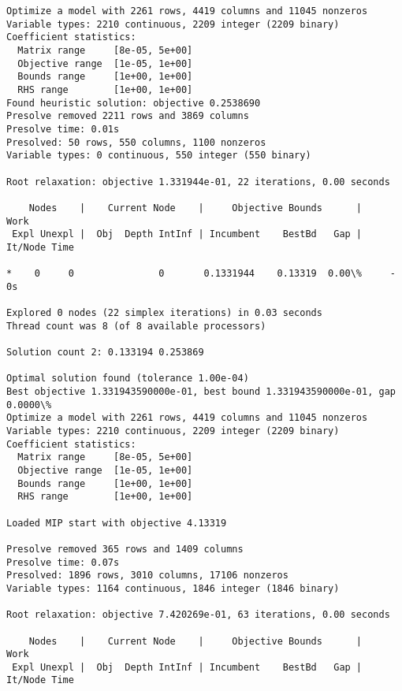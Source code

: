 \documentclass[11pt]{article}
\begin{document}
    \begin{Verbatim}[commandchars=\\\{\}]
Optimize a model with 2261 rows, 4419 columns and 11045 nonzeros
Variable types: 2210 continuous, 2209 integer (2209 binary)
Coefficient statistics:
  Matrix range     [8e-05, 5e+00]
  Objective range  [1e-05, 1e+00]
  Bounds range     [1e+00, 1e+00]
  RHS range        [1e+00, 1e+00]
Found heuristic solution: objective 0.2538690
Presolve removed 2211 rows and 3869 columns
Presolve time: 0.01s
Presolved: 50 rows, 550 columns, 1100 nonzeros
Variable types: 0 continuous, 550 integer (550 binary)

Root relaxation: objective 1.331944e-01, 22 iterations, 0.00 seconds

    Nodes    |    Current Node    |     Objective Bounds      |     Work
 Expl Unexpl |  Obj  Depth IntInf | Incumbent    BestBd   Gap | It/Node Time

*    0     0               0       0.1331944    0.13319  0.00\%     -    0s

Explored 0 nodes (22 simplex iterations) in 0.03 seconds
Thread count was 8 (of 8 available processors)

Solution count 2: 0.133194 0.253869 

Optimal solution found (tolerance 1.00e-04)
Best objective 1.331943590000e-01, best bound 1.331943590000e-01, gap 0.0000\%
Optimize a model with 2261 rows, 4419 columns and 11045 nonzeros
Variable types: 2210 continuous, 2209 integer (2209 binary)
Coefficient statistics:
  Matrix range     [8e-05, 5e+00]
  Objective range  [1e-05, 1e+00]
  Bounds range     [1e+00, 1e+00]
  RHS range        [1e+00, 1e+00]

Loaded MIP start with objective 4.13319

Presolve removed 365 rows and 1409 columns
Presolve time: 0.07s
Presolved: 1896 rows, 3010 columns, 17106 nonzeros
Variable types: 1164 continuous, 1846 integer (1846 binary)

Root relaxation: objective 7.420269e-01, 63 iterations, 0.00 seconds

    Nodes    |    Current Node    |     Objective Bounds      |     Work
 Expl Unexpl |  Obj  Depth IntInf | Incumbent    BestBd   Gap | It/Node Time


\end{Verbatim}
\end{document}
